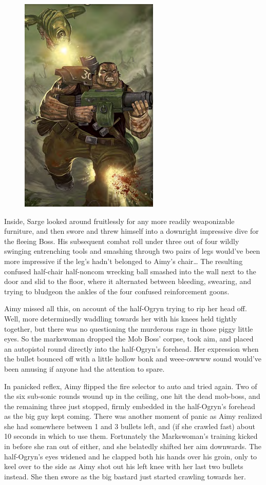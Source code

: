 \begin{figure}
	\begin{center}
		\includegraphics[width=\figwidth]{pics/21/53.png}
	\end{center}
\end{figure}
Inside, Sarge looked around fruitlessly for any more readily weaponizable furniture, and then swore and threw himself into a downright impressive dive for the fleeing Boss. 
His subsequent combat roll under three out of four wildly swinging entrenching tools and smashing through two pairs of legs would've been more impressive if the leg's hadn't belonged to Aimy's chair… The resulting confused half-chair half-noncom wrecking ball smashed into the wall next to the door and slid to the floor, where it alternated between bleeding, swearing, and trying to bludgeon the ankles of the four confused reinforcement goons.

Aimy missed all this, on account of the half-Ogryn trying to rip her head off. 
Well, more determinedly waddling towards her with his knees held tightly together, but there was no questioning the murderous rage in those piggy little eyes. 
So the markswoman dropped the Mob Boss' corpse, took aim, and placed an autopistol round directly into the half-Ogryn's forehead. 
Her expression when the bullet bounced off with a little hollow bonk and weee-owwww sound would've been amusing if anyone had the attention to spare.

In panicked reflex, Aimy flipped the fire selector to auto and tried again. 
Two of the six sub-sonic rounds wound up in the ceiling, one hit the dead mob-boss, and the remaining three just stopped, firmly embedded in the half-Ogryn's forehead as the big guy kept coming. 
There was another moment of panic as Aimy realized she had somewhere between 1 and 3 bullets left, and (if she crawled fast) about 10 seconds in which to use them. 
Fortunately the Markswoman's training kicked in before she ran out of either, and she belatedly shifted her aim downwards. 
The half-Ogryn's eyes widened and he clapped both his hands over his groin, only to keel over to the side as Aimy shot out his left knee with her last two bullets instead. 
She then swore as the big bastard just started crawling towards her.

